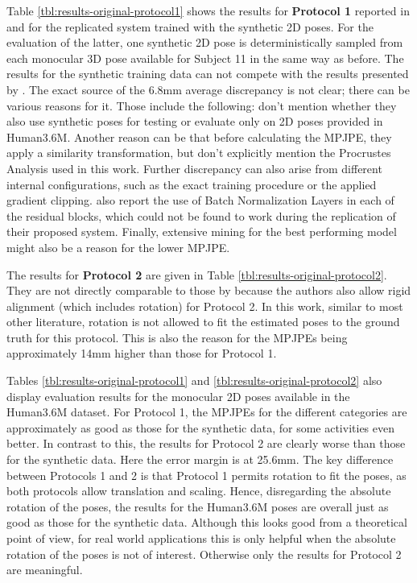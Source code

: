 



Table \ref{tbl:results-original-protocol1} shows the results for \textbf{Protocol 1} reported in \cite{drover18} and for the replicated system trained with the synthetic 2D poses.
For the evaluation of the latter, one synthetic 2D pose is deterministically sampled from each monocular 3D pose available for Subject 11 in the same way as before.
The results for the synthetic training data can not compete with the results presented by \citet{drover18}.
The exact source of the 6.8mm average discrepancy is not clear; there can be various reasons for it.
Those include the following:
\citet{drover18} don't mention whether they also use synthetic poses for testing or evaluate only on 2D poses provided in Human3.6M.
Another reason can be that before calculating the MPJPE, they apply a similarity transformation, but don't explicitly mention the Procrustes Analysis used in this work.
Further discrepancy can also arise from different internal configurations, such as the exact training procedure or the applied gradient clipping.
\citet{drover18} also report the use of Batch Normalization Layers in each of the residual blocks, which could not be found to work during the replication of their proposed system.
Finally, extensive mining for the best performing model might also be a reason for the lower MPJPE.

The results for \textbf{Protocol 2} are given in Table \ref{tbl:results-original-protocol2}.
They are not directly comparable to those by \citet{drover18} because the authors also allow rigid alignment (which includes rotation) for Protocol 2.
In this work, similar to most other literature, rotation is not allowed to fit the estimated poses to the ground truth for this protocol.
This is also the reason for the MPJPEs being approximately 14mm higher than those for Protocol 1.

Tables \ref{tbl:results-original-protocol1} and \ref{tbl:results-original-protocol2} also display evaluation results for the monocular 2D poses available in the Human3.6M dataset.
For Protocol 1, the MPJPEs for the different categories are approximately as good as those for the synthetic data, for some activities even better.
In contrast to this, the results for Protocol 2 are clearly worse than those for the synthetic data.
Here the error margin is at 25.6mm.
The key difference between Protocols 1 and 2 is that Protocol 1 permits rotation to fit the poses, as both protocols allow translation and scaling.
Hence, disregarding the absolute rotation of the poses, the results for the Human3.6M poses are overall just as good as those for the synthetic data.
Although this looks good from a theoretical point of view, for real world applications this is only helpful when the absolute rotation of the poses is not of interest.
Otherwise only the results for Protocol 2 are meaningful.

